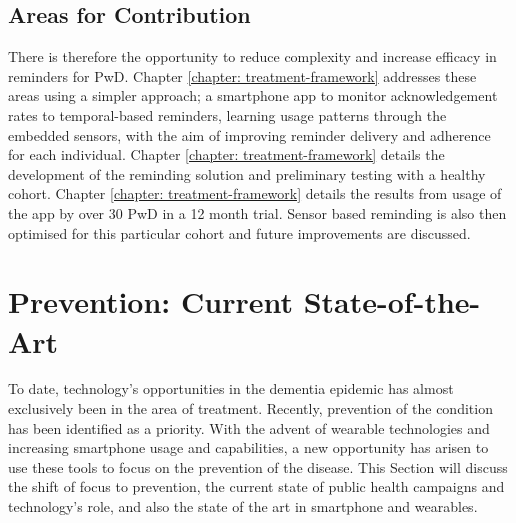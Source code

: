 \subsection{Areas for Contribution}
There is therefore the opportunity to reduce complexity and increase efficacy in reminders for PwD. Chapter \ref{chapter: treatment-framework} addresses these areas using a simpler approach; a smartphone app to monitor acknowledgement rates to temporal-based reminders, learning usage patterns through the embedded sensors, with the aim of improving reminder delivery and adherence for each individual. Chapter \ref{chapter: treatment-framework} details the development of the reminding solution and preliminary testing with a healthy cohort. Chapter \ref{chapter: treatment-framework} details the results from usage of the app by over 30 PwD in a 12 month trial. Sensor based reminding is also then optimised for this particular cohort and future improvements are discussed.

\section{Prevention: Current State-of-the-Art}
To date, technology's opportunities in the dementia epidemic has almost exclusively been in the area of treatment. Recently, prevention of the condition has been identified as a priority. With the advent of wearable technologies and increasing smartphone usage and capabilities, a new opportunity has arisen to use these tools to focus on the prevention of the disease.
This Section will discuss the shift of focus to prevention, the current state of public health campaigns and technology's role, and also the state of the art in smartphone and wearables.

